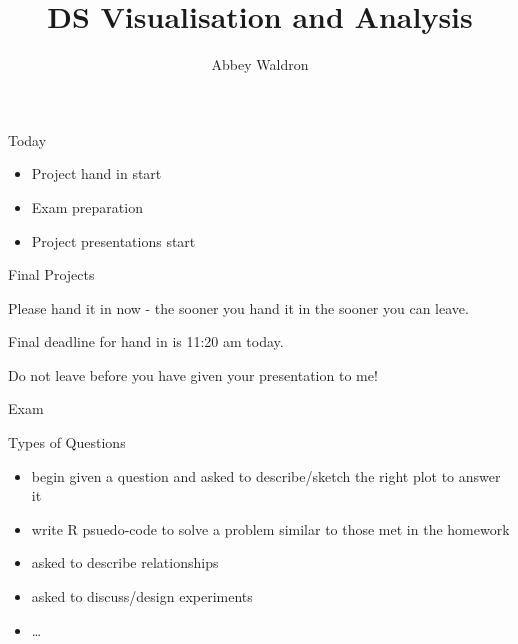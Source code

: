 \documentclass{beamer}
\newif\ifplacelogo
\begin{document}
\setlength{\unitlength}{1mm}
\title{DS Visualisation and Analysis}
\author[Abbey Waldron]{Abbey Waldron}
\date[October 30th, 2015]{}





{
\placelogofalse
\begin{frame}
  \titlepage
\end{frame}
}


\begin{frame}{Today}

\begin{itemize}
\item Project hand in start
\item Exam preparation
\item Project presentations start
\end{itemize}

\end{frame}



\begin{frame}{Final Projects}

Please hand it in now - the sooner you hand it in the sooner you can leave.

\vspace{5mm}

Final deadline for hand in is 11:20 am today.

\vspace{5mm}

Do not leave before you have given your presentation to me!

\end{frame}


\begin{frame}{Exam}

\end{frame}


\begin{frame}{Types of Questions}

\begin{itemize}
\item begin given a question and asked to describe/sketch the right plot to answer it
\item write R psuedo-code to solve a problem similar to those met in the homework
\item asked to describe relationships
\item asked to discuss/design experiments
\item \ldots
\end{itemize}

\end{frame}
\end{document}
